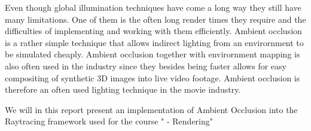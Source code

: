 Even though global illumination techniques have come a long way they still have many limitations. One of them is the often long render times they require and the difficulties of implementing and working with them efficiently. Ambient occlusion is a rather simple technique that allows indirect lighting from an envirornment to be simulated cheaply. Ambient occlusion together with envirornment mapping is also often used in the industry since they besides being faster allows for easy compositing of synthetic 3D images into live video footage\cite{Landis2002}. Ambient occlusion is therefore an often used lighting technique in the movie industry.

We will in this report present an implementation of Ambient Occlusion into the Raytracing framework used for the course " - Rendering"
